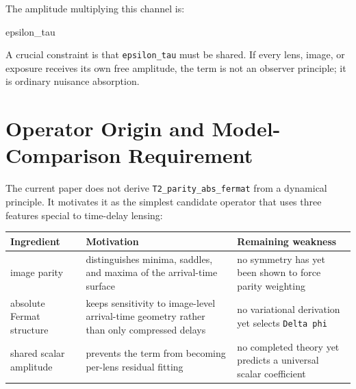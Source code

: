 \documentclass[11pt]{article}
\newenvironment{Shaded}{}{}
\newcommand{\NormalTok}[1]{#1}
\newcounter{none} %
\begin{document}
The amplitude multiplying this channel is:

\begin{Shaded}
\begin{Highlighting}[]
\NormalTok{epsilon\_tau}
\end{Highlighting}
\end{Shaded}

A crucial constraint is that \texttt{epsilon\_tau} must be shared. If
every lens, image, or exposure receives its own free amplitude, the term
is not an observer principle; it is ordinary nuisance absorption.

\section{Operator Origin and Model-Comparison
Requirement}\label{operator-origin-and-model-comparison-requirement}

The current paper does not derive \texttt{T2\_parity\_abs\_fermat} from
a dynamical principle. It motivates it as the simplest candidate
operator that uses three features special to time-delay lensing:

{\def\LTcaptype{none} %
\begin{longtable}[]{@{}
  >{\raggedright\arraybackslash}p{}
  >{\raggedright\arraybackslash}p{}
  >{\raggedright\arraybackslash}p{}@{}}
\toprule\noalign{}
\begin{minipage}[b]{\linewidth}\raggedright
Ingredient
\end{minipage} & \begin{minipage}[b]{\linewidth}\raggedright
Motivation
\end{minipage} & \begin{minipage}[b]{\linewidth}\raggedright
Remaining weakness
\end{minipage} \\
\midrule\noalign{}
\endhead
\bottomrule\noalign{}
\endlastfoot
image parity & distinguishes minima, saddles, and maxima of the
arrival-time surface & no symmetry has yet been shown to force parity
weighting \\
absolute Fermat structure & keeps sensitivity to image-level
arrival-time geometry rather than only compressed delays & no
variational derivation yet selects
\texttt{\textbar{}Delta\ phi\textbar{}} \\
shared scalar amplitude & prevents the term from becoming per-lens
residual fitting & no completed theory yet predicts a universal scalar
coefficient \\
\end{longtable}
}
\end{document}
